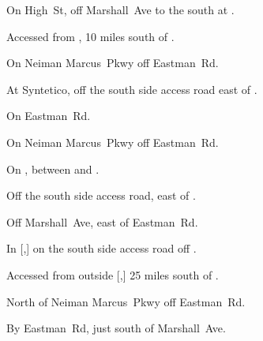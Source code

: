 
\begin{LocationList}

On High~St, off  Marshall~Ave to the south at .

Accessed from , 10 miles south of .

On Neiman Marcus~Pkwy off  Eastman~Rd.

At Syntetico, off the  south side access road east of .

On  Eastman~Rd.

On Neiman Marcus~Pkwy off  Eastman~Rd.

On , between  and .

Off the  south side access road, east of .

Off  Marshall~Ave, east of  Eastman~Rd.

\Location{\TruckStop \Gas \Rest \Service \Weigh}
In [,] on the south side  access road off .

Accessed from  outside [,] 25 miles south of .

North of Neiman Marcus~Pkwy off  Eastman~Rd.

By  Eastman~Rd, just south of  Marshall~Ave.

\end{LocationList}
